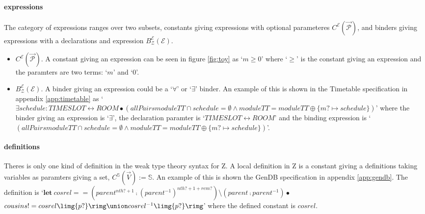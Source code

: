 \paragraph{expressions}
\label{subsubsec:expressions}

The category of expressions ranges over two subsets, constants giving expressions with optional parameteres $C^{\mathcal{E}}(\overrightarrow{\mathcal{P}})$, and binders giving expressions with a declarations and expression $B^{\mathcal{E}}_{\mathcal{Z}}(\mathcal{E})$.

\begin{itemize}
\item $C^{\mathcal{E}}(\overrightarrow{\mathcal{P}})$. A constant giving an expression can be seen in figure \ref{fig:toy} as `$m \geq 0$' where `$\geq$' is the constant giving an expression and the paramters are two terms: `$m$' and `$0$'.

\item $B^{\mathcal{E}}_{\mathcal{Z}}(\mathcal{E})$. A binder giving an expression could be a `$\forall$' or `$\exists$' binder. An example of this is shown in the Timetable specification in appendix \ref{app:timetable} as
\newline
`$\exists schedule : TIMESLOT \leftrightarrow ROOM \bullet(allPairs moduleTT \cap
schedule = \emptyset \land moduleTT = moduleTT \oplus \{m? \mapsto schedule\})$'
\newline
where the binder giving an expression is `$\exists$', the declaration paramter is `$TIMESLOT \leftrightarrow ROOM$' and the binding expression is `$(allPairs moduleTT \cap
schedule = \emptyset \land moduleTT = moduleTT \oplus \{m? \mapsto schedule\})$'.
\end{itemize}

\paragraph{definitions}
\label{subsubsec:definitions}

Theres is only one kind of definition in the weak type theory syntax for Z. A local definition in Z is a constant giving a definitions taking variables as paramters giving a set, $C^{\mathbb{S}}(\overrightarrow{V}):= \mathbb{S}$. An example of this is shown the GenDB specification in appendix \ref{app:gendb}. The definition is
\newline
 `$\mathbf{let}\ cosrel==(parent^{nth?+1}\comp(parent^{-1})^{nth?+1+rem?})\setminus (parent \comp parent^{-1}) \bullet$\newline
\indent $cousins! = cosrel \limg \{p?\}\rimg \union cosrel^{-1} \limg \{p?\} \rimg$'
\newline
where the defined constant is $cosrel$.

